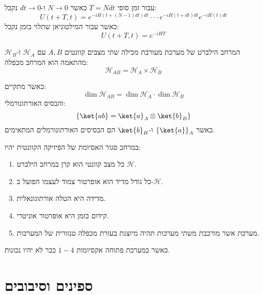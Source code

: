 \documentclass{tstextbook}
\begin{document}
עבור זמן סופי \(T=Ndt\) כאשר \(N\to 0\) ו-\(dt \to 0\) נקבל:
$$U\left(t+T,t\right)=e^{-i H\left(t+\left(N-1\right)d t\right)d t}\cdot\cdot\cdot e^{-i H\left(t+d t\right)d t}e^{-i H\left(t\right)d t}$$
כאשר עבור המילטוניאן שתלוי בזמן נקבל:
$$U(t+T,t)=e^{ -iHT }$$

\begin{definition}
המרחב הילברט של מערכת מעורבת מכילה שתי מצבים קוונטים \(A,B\) עם \(\mathcal{H}_{A}\) ו-\(\mathcal{H}_{B}\) מהתאמה הוא המרחב מכפלה:
$$\mathcal{H}_{AB}=\mathcal{H}_{A}\times \mathcal{H}_{B}$$

\end{definition}
כאשר מתקיים:
$$\dim \mathcal{H}_{AB}=\dim \mathcal{H}_{A} \cdot \dim \mathcal{H}_{B}$$
והבסיס האורתונורמלי:
$$\left\{  \ket{ab} =\ket{a} _{A}\otimes \ket{b} _{B}  \right\}$$
כאשר \(\left\{  \ket{a}  \right\}_{A}\) ו-\(\ket{b}_{B}\) הם הבסיסים האורתונורמלים המתאימים.

\begin{summary}
במרחב סגור האסיומת של הפיזיקה הקוונטית יהיו:

  \begin{enumerate}
    \item כל מצב קוונטי הוא קרן במרחב הילברט \(\mathcal{H}\). 


    \item כל גודל מדיד הוא אופרטור צמוד לעצמו הפועל ב-\(\mathcal{H}\). 


    \item מדידה היא הטלה אורתוגונאלית. 


    \item קידום בזמן היא אופרטור אוניטרי. 


    \item מערכת אשר מורכבת משתי מערכות תהיה מיוצגת בעזרת מכפלה טנזורית של המערכות. 


  \end{enumerate}
\end{summary}
כאשר במערכת פתוחה אקסיומות \(1-4\) כבר לא יהיו נכונות.

\section{ספינים וסיבובים}
\end{document}
